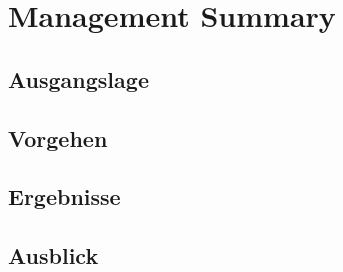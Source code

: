 \chapter*{Management Summary}
\section*{Ausgangslage}

\section*{Vorgehen}

\section*{Ergebnisse}

\section*{Ausblick}
